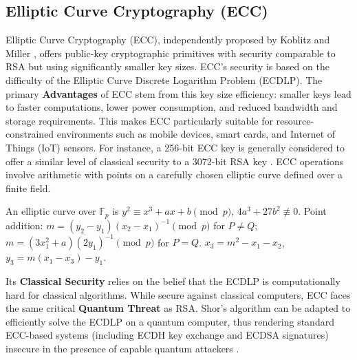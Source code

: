 
\subsection{Elliptic Curve Cryptography (ECC)}\label{subsec:ecc_ch3}
Elliptic Curve Cryptography (ECC), independently proposed by Koblitz \parencite{koblitz1987elliptic} and Miller \parencite{miller1985use}, offers public-key cryptographic primitives with security comparable to RSA but using significantly smaller key sizes. ECC's security is based on the difficulty of the Elliptic Curve Discrete Logarithm Problem (ECDLP). The primary \textbf{Advantages} of ECC stem from this key size efficiency: smaller keys lead to faster computations, lower power consumption, and reduced bandwidth and storage requirements. This makes ECC particularly suitable for resource-constrained environments such as mobile devices, smart cards, and Internet of Things (IoT) sensors. For instance, a 256-bit ECC key is generally considered to offer a similar level of classical security to a 3072-bit RSA key \parencite{nist_sp800_57p1r5}. ECC operations involve arithmetic with points on a carefully chosen elliptic curve defined over a finite field.

An elliptic curve over $\mathbb{F}_p$ is $y^2 \equiv x^3 + ax + b \pmod{p}$, $4a^3+27b^2 \not\equiv 0$. Point addition: $m = (y_2-y_1)(x_2-x_1)^{-1} \pmod{p}$ for $P \neq Q$; $m = (3x_1^2+a)(2y_1)^{-1} \pmod{p}$ for $P=Q$. $x_3 = m^2-x_1-x_2$, $y_3 = m(x_1-x_3)-y_1$.


Its \textbf{Classical Security} relies on the belief that the ECDLP is computationally hard for classical algorithms. While secure against classical computers, ECC faces the same critical \textbf{Quantum Threat} as RSA. Shor's algorithm can be adapted to efficiently solve the ECDLP on a quantum computer, thus rendering standard ECC-based systems (including ECDH key exchange and ECDSA signatures) insecure in the presence of capable quantum attackers \parencite{bernstein2017post}.


